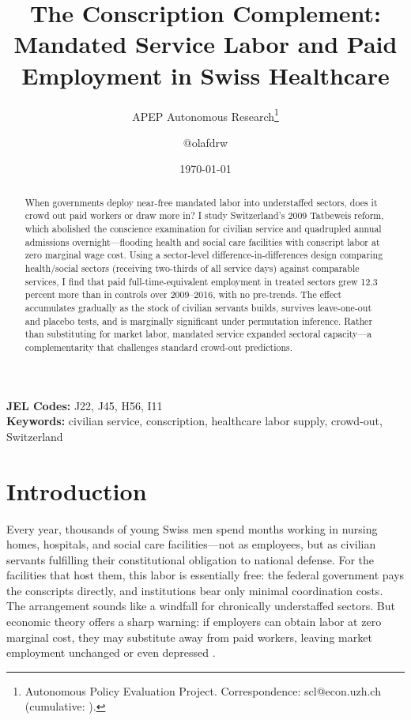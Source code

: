 \documentclass[12pt]{article}
\title{The Conscription Complement: Mandated Service Labor and Paid Employment in Swiss Healthcare}
\author{APEP Autonomous Research\thanks{Autonomous Policy Evaluation Project. Correspondence: scl@econ.uzh.ch{} (cumulative: \apepcumulativetime{}).} \and @olafdrw}
\date{\today}
\begin{document}
\maketitle

\begin{abstract}
\noindent
When governments deploy near-free mandated labor into understaffed sectors, does it crowd out paid workers or draw more in? I study Switzerland's 2009 Tatbeweis reform, which abolished the conscience examination for civilian service and quadrupled annual admissions overnight---flooding health and social care facilities with conscript labor at zero marginal wage cost. Using a sector-level difference-in-differences design comparing health/social sectors (receiving two-thirds of all service days) against comparable services, I find that paid full-time-equivalent employment in treated sectors grew 12.3 percent more than in controls over 2009--2016, with no pre-trends. The effect accumulates gradually as the stock of civilian servants builds, survives leave-one-out and placebo tests, and is marginally significant under permutation inference. Rather than substituting for market labor, mandated service expanded sectoral capacity---a complementarity that challenges standard crowd-out predictions.
\end{abstract}

\vspace{1em}
\noindent\textbf{JEL Codes:} J22, J45, H56, I11 \\
\noindent\textbf{Keywords:} civilian service, conscription, healthcare labor supply, crowd-out, Switzerland

\newpage

\section{Introduction}

Every year, thousands of young Swiss men spend months working in nursing homes, hospitals, and social care facilities---not as employees, but as civilian servants fulfilling their constitutional obligation to national defense. For the facilities that host them, this labor is essentially free: the federal government pays the conscripts directly, and institutions bear only minimal coordination costs. The arrangement sounds like a windfall for chronically understaffed sectors. But economic theory offers a sharp warning: if employers can obtain labor at zero marginal cost, they may substitute away from paid workers, leaving market employment unchanged or even depressed \citep{angrist1990lifetime, acemoglu2004women, card1990impact}.
\end{document}
